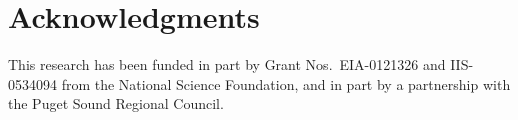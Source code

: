 \documentclass{sig-alternate}
\begin{document}
\newpage

\section{Acknowledgments}

This research has been funded in part by Grant Nos.\ EIA-0121326 and
IIS-0534094 from the National Science Foundation, and in part by a
partnership with the Puget Sound Regional Council.



%
% 
\end{document}

